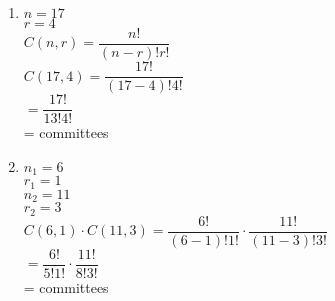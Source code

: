 \begin{enumerate}[label = \arabic*. ]
\begin{multicols}{2}
\begin{enumerate}[label = \alph*. ]
\item %
$n= 17$ \redcheck \\
$r= 4$ \redcheck \\
$ C(n, r) = \dfrac{n!}{(n-r)!r!} $ \redcheck \\
$ C(17, 4) = \dfrac{17!}{(17-4)!4!} $ \redcheck \\
$ = \dfrac{17!}{13!4!} $ \redcheck \\
= \redcheck 
committees \redcheck 

\item %
$n_1= 6$ \redcheck \\
$r_1= 1$ \redcheck \\
$n_2= 11$ \redcheck \\
$r_2= 3$ \redcheck \\
$ C(6, 1) \cdot C(11, 3) = \dfrac{6!}{(6-1)!1!} \cdot \dfrac{11!}{(11-3)!3!} $ \redcheck \\
$ = \dfrac{6!}{5!1!} \cdot \dfrac{11!}{8!3!} $ \redcheck \\
= \redcheck 
committees \redcheck 

\end{enumerate}  
\end{multicols} 
\end{enumerate}  